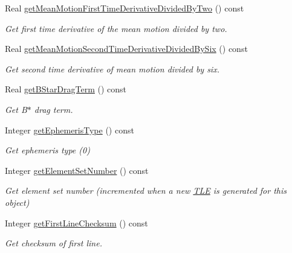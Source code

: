 \begin{DoxyCompactItemize}
Real \hyperlink{classostk_1_1astro_1_1trajectory_1_1orbit_1_1models_1_1sgp4_1_1_t_l_e_acfe76ce49653d9f735abddb908b2a2d9}{get\+Mean\+Motion\+First\+Time\+Derivative\+Divided\+By\+Two} () const
\begin{DoxyCompactList}\small\item\em Get first time derivative of the mean motion divided by two. \end{DoxyCompactList}\item 
Real \hyperlink{classostk_1_1astro_1_1trajectory_1_1orbit_1_1models_1_1sgp4_1_1_t_l_e_a7115d973dfff075411e114542bec8eeb}{get\+Mean\+Motion\+Second\+Time\+Derivative\+Divided\+By\+Six} () const
\begin{DoxyCompactList}\small\item\em Get second time derivative of mean motion divided by six. \end{DoxyCompactList}\item 
Real \hyperlink{classostk_1_1astro_1_1trajectory_1_1orbit_1_1models_1_1sgp4_1_1_t_l_e_a70763fd8cfec5751a9a5d97bdfdbf3d2}{get\+B\+Star\+Drag\+Term} () const
\begin{DoxyCompactList}\small\item\em Get B$\ast$ drag term. \end{DoxyCompactList}\item 
Integer \hyperlink{classostk_1_1astro_1_1trajectory_1_1orbit_1_1models_1_1sgp4_1_1_t_l_e_a6bbac875fb8c5d36c4ad46b7bea67b79}{get\+Ephemeris\+Type} () const
\begin{DoxyCompactList}\small\item\em Get ephemeris type (0) \end{DoxyCompactList}\item 
Integer \hyperlink{classostk_1_1astro_1_1trajectory_1_1orbit_1_1models_1_1sgp4_1_1_t_l_e_a115316d7355d615749dd7cb96d2c16c9}{get\+Element\+Set\+Number} () const
\begin{DoxyCompactList}\small\item\em Get element set number (incremented when a new \hyperlink{classostk_1_1astro_1_1trajectory_1_1orbit_1_1models_1_1sgp4_1_1_t_l_e}{T\+LE} is generated for this object) \end{DoxyCompactList}\item 
Integer \hyperlink{classostk_1_1astro_1_1trajectory_1_1orbit_1_1models_1_1sgp4_1_1_t_l_e_a9794bb184799595fefc8828c2849538c}{get\+First\+Line\+Checksum} () const
\begin{DoxyCompactList}\small\item\em Get checksum of first line. \end{DoxyCompactList}\item 

\end{DoxyCompactItemize}
